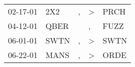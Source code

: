 \begin{supertabular}{p{0.07\textwidth}p{0.06\textwidth}p{0.02\textwidth}p{0.02\textwidth}p{0.06\textwidth}}
          02-17-01\textsuperscript{} &            2X2\textsuperscript{} &             , &  \textgreater &  PRCH\textsuperscript{} \\
          04-12-01\textsuperscript{} &           QBER\textsuperscript{} &               &             , &  FUZZ\textsuperscript{} \\
          06-01-01\textsuperscript{} &           SWTN\textsuperscript{} &             , &  \textgreater &  SWTN\textsuperscript{} \\
          06-22-01\textsuperscript{} &           MANS\textsuperscript{} &             , &  \textgreater &  ORDE\textsuperscript{} \\
\end{supertabular}
